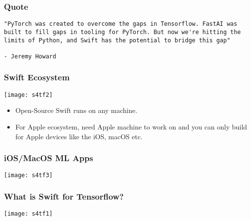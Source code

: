 \begin{frame}[fragile]\frametitle{Quote}
\begin{lstlisting}
"PyTorch was created to overcome the gaps in Tensorflow. FastAI was built to fill gaps in tooling for PyTorch. But now we're hitting the limits of Python, and Swift has the potential to bridge this gap"

- Jeremy Howard
\end{lstlisting}
\end{frame}


\begin{frame} \frametitle{Swift Ecosystem}
\begin{center}
\texttt{[image: s4tf2]}
\end{center}

\begin{itemize}
\item Open-Source Swift runs on any machine.
\item For Apple ecosystem, need Apple machine to work on and you can only build for Apple devices like the iOS, macOS etc.
\end{itemize}

\end{frame}

\begin{frame} \frametitle{iOS/MacOS ML Apps}
\begin{center}
\texttt{[image: s4tf3]}
\end{center}
\end{frame}



\begin{frame} \frametitle{What is Swift for Tensorflow?}
\begin{center}
\texttt{[image: s4tf1]}
\end{center}
\end{frame}

